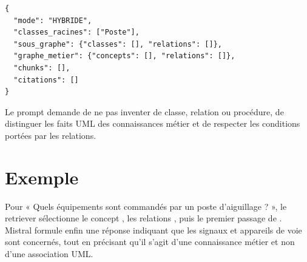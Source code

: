 \begin{lstlisting}[language={},caption={Structure simplifiée du contexte GraphRAG}]
{
  "mode": "HYBRIDE",
  "classes_racines": ["Poste"],
  "sous_graphe": {"classes": [], "relations": []},
  "graphe_metier": {"concepts": [], "relations": []},
  "chunks": [],
  "citations": []
}
\end{lstlisting}

Le prompt demande de ne pas inventer de classe, relation ou procédure, de distinguer les faits UML des connaissances métier et de respecter les conditions portées par les relations.

\section{Exemple}

Pour « Quels équipements sont commandés par un poste d'aiguillage ? », le retriever sélectionne le concept , les relations , puis le premier passage de . Mistral formule enfin une réponse indiquant que les signaux et appareils de voie sont concernés, tout en précisant qu'il s'agit d'une connaissance métier et non d'une association UML.


